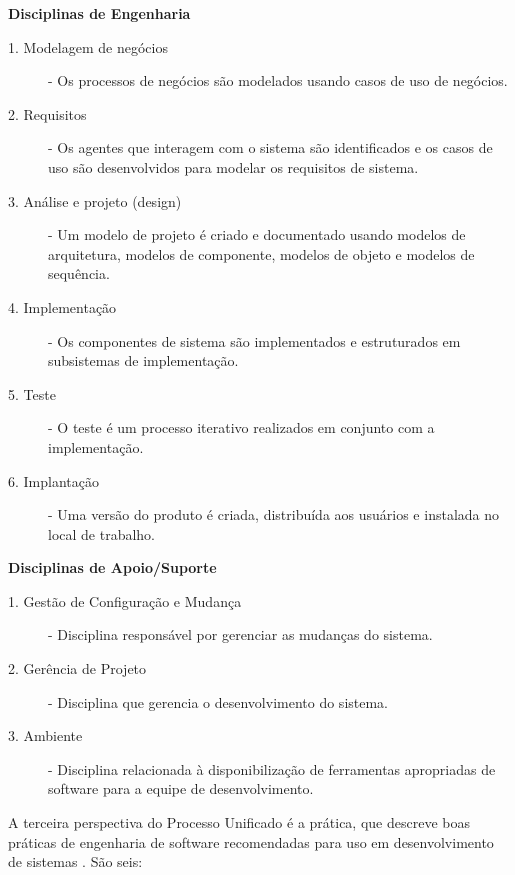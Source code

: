 \documentclass[
	article,			%
	11pt,				%
	oneside,			%
	a4paper,			%
	english,			%
	brazil,				%
	sumario=tradicional
	]{abntex2}
\begin{document}
\textbf{Disciplinas de Engenharia}

\begin{description}
   \item[1. Modelagem de negócios] - Os processos de negócios são modelados
   usando casos de uso de negócios.
   \item[2. Requisitos] - Os agentes que interagem com o sistema são
   identificados e os casos de uso são desenvolvidos para modelar os requisitos de sistema.
   \item[3. Análise e projeto (design)] - Um modelo de projeto é criado e
   documentado usando modelos de arquitetura, modelos de componente, modelos de
   objeto e modelos de sequência.
   \item[4. Implementação] - Os componentes de sistema são implementados e
   estruturados em subsistemas de implementação.
   \item[5. Teste] - O teste é um processo iterativo realizados em conjunto com
   a implementação.
   \item[6. Implantação] - Uma versão do produto é criada, distribuída aos
   usuários e instalada no local de trabalho.
\end{description}

\textbf{Disciplinas de Apoio/Suporte}

\begin{description}
   \item[1. Gestão de Configuração e Mudança] - Disciplina responsável por
   gerenciar as mudanças do sistema.
   \item[2. Gerência de Projeto] - Disciplina que gerencia o desenvolvimento do
   sistema.
   \item[3. Ambiente] - Disciplina relacionada à disponibilização de ferramentas
   apropriadas de software para a equipe de desenvolvimento.
\end{description}

A terceira perspectiva do Processo Unificado é a prática, que descreve boas
práticas de engenharia de software recomendadas para uso em desenvolvimento de
sistemas \cite{sommerville2007}. São seis:
\end{document}
